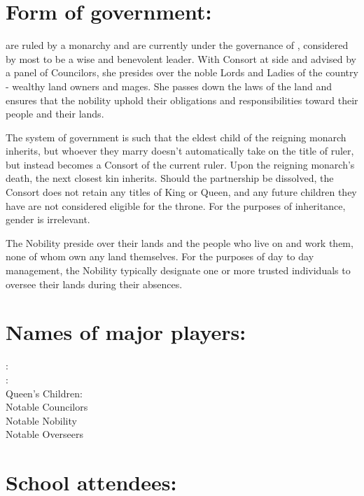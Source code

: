 \documentclass[blue]{GL2020}
\begin{document}
\name{\bAgrarians{}}
\section*{Form of government:}

\pFarm{} are ruled by a monarchy and are currently under the governance of \cQueen{}, considered by most to be a wise and benevolent leader.  With \cQueen{\they} Consort at \cQueen{\their} side and advised by a panel of Councilors, she presides over the noble Lords and Ladies of the country - wealthy land owners and mages.  She passes down the laws of the land and ensures that the nobility uphold their obligations and responsibilities toward their people and their lands.

The system of government is such that the eldest child of the reigning monarch inherits, but whoever they marry doesn't automatically take on the title of ruler, but instead becomes a Consort of the current ruler.  Upon the reigning monarch's death, the next closest kin inherits.  Should the partnership be dissolved, the Consort does not retain any titles of King or Queen, and any future children they have are not considered eligible for the throne.  For the purposes of inheritance, gender is irrelevant.

The Nobility preside over their lands and the people who live on and work them, none of whom own any land themselves.  For the purposes of day to day management, the Nobility typically designate one or more trusted individuals to oversee their lands during their absences.


\section*{Names of major players:}

\cQueen{}:\\
\cConsort{}:\\
Queen's Children:\\
Notable Councilors\\
Notable Nobility\\
Notable Overseers\\

\section*{School attendees:}
\end{document}
